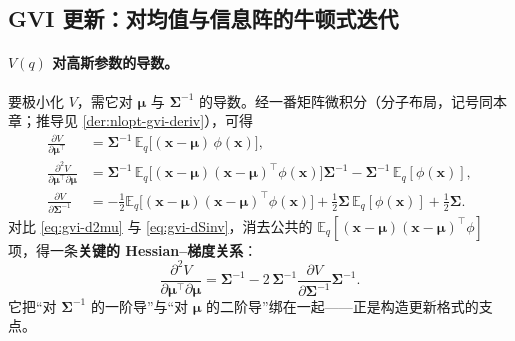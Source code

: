 \subsection{GVI 更新：对均值与信息阵的牛顿式迭代}
\label{sec:nlopt-gvi-update}

\paragraph{$V(q)$ 对高斯参数的导数。}
要极小化 $V$，需它对 $\boldsymbol{\mu}$ 与 $\boldsymbol{\Sigma}^{-1}$ 的导数。经一番矩阵微积分（分子布局，记号同本章；推导见 \cref{der:nlopt-gvi-deriv}），可得\cite{opper2009variational,barfoot2024state}
\begin{subequations}\label{eq:gvi-derivs}
\begin{align}
  \frac{\partial V}{\partial\boldsymbol{\mu}^\top}&=\boldsymbol{\Sigma}^{-1}\,\mathbb{E}_q\big[(\mathbf{x}-\boldsymbol{\mu})\,\phi(\mathbf{x})\big],\label{eq:gvi-dmu}\\
  \frac{\partial^2 V}{\partial\boldsymbol{\mu}^\top\partial\boldsymbol{\mu}}&=\boldsymbol{\Sigma}^{-1}\,\mathbb{E}_q\big[(\mathbf{x}-\boldsymbol{\mu})(\mathbf{x}-\boldsymbol{\mu})^\top\phi(\mathbf{x})\big]\boldsymbol{\Sigma}^{-1}-\boldsymbol{\Sigma}^{-1}\,\mathbb{E}_q[\phi(\mathbf{x})],\label{eq:gvi-d2mu}\\
  \frac{\partial V}{\partial\boldsymbol{\Sigma}^{-1}}&=-\tfrac12\mathbb{E}_q\big[(\mathbf{x}-\boldsymbol{\mu})(\mathbf{x}-\boldsymbol{\mu})^\top\phi(\mathbf{x})\big]+\tfrac12\boldsymbol{\Sigma}\,\mathbb{E}_q[\phi(\mathbf{x})]+\tfrac12\boldsymbol{\Sigma}.\label{eq:gvi-dSinv}
\end{align}
\end{subequations}
对比 \cref{eq:gvi-d2mu} 与 \cref{eq:gvi-dSinv}，消去公共的 $\mathbb{E}_q[(\mathbf{x}-\boldsymbol{\mu})(\mathbf{x}-\boldsymbol{\mu})^\top\phi]$ 项，得一条\textbf{关键的 Hessian--梯度关系}：
\begin{equation}
  \frac{\partial^2 V}{\partial\boldsymbol{\mu}^\top\partial\boldsymbol{\mu}}=\boldsymbol{\Sigma}^{-1}-2\,\boldsymbol{\Sigma}^{-1}\frac{\partial V}{\partial\boldsymbol{\Sigma}^{-1}}\boldsymbol{\Sigma}^{-1}.
  \label{eq:gvi-hessgrad}
\end{equation}
它把“对 $\boldsymbol{\Sigma}^{-1}$ 的一阶导”与“对 $\boldsymbol{\mu}$ 的二阶导”绑在一起——正是构造更新格式的支点。

